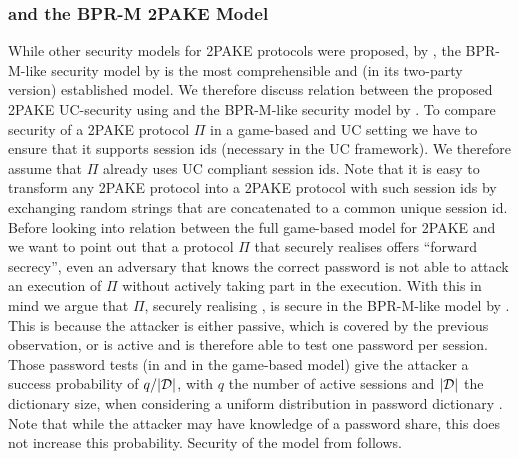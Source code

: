 \subsubsection{\FTWOPAKE and the BPR-M 2PAKE Model}
While other security models for \ac{2PAKE} protocols were proposed, \eg by \citet{SzydloK05}, the \ac{BPR-M}-like security model by \citet{Katz2012a} is the most comprehensible and (in its two-party version) established model.
We therefore discuss relation between the proposed \ac{2PAKE} \ac{UC}-security using \FTWOPAKE and the \ac{BPR-M}-like security model by \citet{Katz2012a}.
To compare security of a \ac{2PAKE} protocol $\Pi$ in a game-based and \ac{UC} setting we have to ensure that it supports session ids (necessary in the \ac{UC} framework).
We therefore assume that $\Pi$ already uses \ac{UC} compliant session ids.
Note that it is easy to transform any \ac{2PAKE} protocol into a \ac{2PAKE} protocol with such session ids by exchanging random strings that are concatenated to a common unique session id.
Before looking into relation between the full game-based model for \ac{2PAKE} and \FTWOPAKE we want to point out that a protocol $\Pi$ that securely realises \FTWOPAKE offers ``forward secrecy'', \ie even an adversary that knows the correct password is not able to attack an execution of $\Pi$ without actively taking part in the execution.
With this in mind we argue that $\Pi$, securely realising \FTWOPAKE, is secure in the \ac{BPR-M}-like model by \citet{Katz2012a}.
This is because the attacker is either passive, which is covered by the previous observation, or is active and is therefore able to test one password per session.
Those password tests (\TestPwd in \FTWOPAKE and \Send in the game-based model) give the attacker a success probability of $q/|\mathcal{D}|$, with $q$ the number of active sessions and $|\mathcal{D}|$ the dictionary size, when considering a uniform distribution in password dictionary \cD.
Note that while the attacker may have knowledge of a password share, this does not increase this probability.
Security of the model from \citet{Katz2012a} follows.

